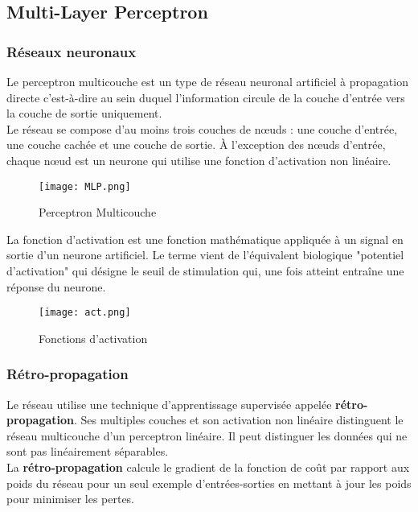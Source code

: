 \documentclass[a4paper,french,12pt]{article}
\begin{document}
\subsection{Multi-Layer Perceptron}

\subsubsection{Réseaux neuronaux}

Le perceptron multicouche est un type de réseau neuronal artificiel à propagation directe c'est-à-dire au sein duquel l'information circule de la couche d'entrée vers la couche de sortie uniquement.\\

Le réseau se compose d'au moins trois couches de nœuds : une couche d'entrée, une couche cachée et une couche de sortie. À l'exception des nœuds d'entrée, chaque nœud est un neurone qui utilise une fonction d'activation non linéaire.

\begin{figure}[!h]
    \centering
    \texttt{[image: MLP.png]}
    \caption{Perceptron Multicouche}
\end{figure}

La fonction d'activation est une fonction mathématique appliquée à un signal en sortie d'un neurone artificiel. Le terme vient de l'équivalent biologique "potentiel d'activation" qui désigne le seuil de stimulation qui, une fois atteint entraîne une réponse du neurone.

\begin{figure}[!h]
    \centering
    \texttt{[image: act.png]}
    \caption{Fonctions d'activation}
\end{figure}

\newpage

\subsubsection{Rétro-propagation}

Le réseau utilise une technique d'apprentissage supervisée appelée \textbf{rétro-propagation}. Ses multiples couches et son activation non linéaire distinguent le réseau multicouche d'un perceptron linéaire. Il peut distinguer les données qui ne sont pas linéairement séparables.\\

La \textbf{rétro-propagation} calcule le gradient de la fonction de coût par rapport aux poids du réseau pour un seul exemple d'entrées-sorties en mettant à jour les poids pour minimiser les pertes.\\
\end{document}
